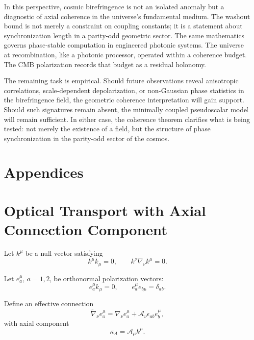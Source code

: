 \documentclass[12pt]{article}
\begin{document}
In this perspective, cosmic birefringence is not an isolated anomaly but a diagnostic of axial coherence in the universe’s fundamental medium. The washout bound is not merely a constraint on coupling constants; it is a statement about synchronization length in a parity-odd geometric sector. The same mathematics governs phase-stable computation in engineered photonic systems. The universe at recombination, like a photonic processor, operated within a coherence budget. The CMB polarization records that budget as a residual holonomy.

The remaining task is empirical. Should future observations reveal anisotropic correlations, scale-dependent depolarization, or non-Gaussian phase statistics in the birefringence field, the geometric coherence interpretation will gain support. Should such signatures remain absent, the minimally coupled pseudoscalar model will remain sufficient. In either case, the coherence theorem clarifies what is being tested: not merely the existence of a field, but the structure of phase synchronization in the parity-odd sector of the cosmos.

\newpage
\section*{Appendices}

\appendix

\section{Optical Transport with Axial Connection Component}

Let $k^\mu$ be a null vector satisfying
\begin{equation}
k^\mu k_\mu = 0,
\qquad
k^\nu \nabla_\nu k^\mu = 0.
\end{equation}

Let $e^\mu_a$, $a=1,2$, be orthonormal polarization vectors:
\begin{equation}
e^\mu_a k_\mu = 0,
\qquad
e^\mu_a e_{b\mu} = \delta_{ab}.
\end{equation}

Define an effective connection
\begin{equation}
\tilde{\nabla}_\nu e^\mu_a
=
\nabla_\nu e^\mu_a
+
\mathcal{A}_\nu
\epsilon_{ab}
e^\mu_b,
\end{equation}
with axial component
\begin{equation}
\kappa_A
=
\mathcal{A}_\mu k^\mu.
\end{equation}
\end{document}
